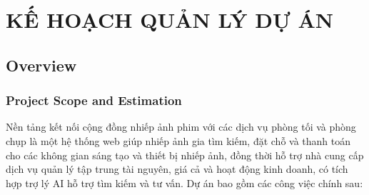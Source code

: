 \chapter{KẾ HOẠCH QUẢN LÝ DỰ ÁN}

\section{Overview}

\subsection{Project Scope and Estimation}

Nền tảng kết nối cộng đồng nhiếp ảnh phim với các dịch vụ phòng tối và phòng chụp là một hệ thống web giúp nhiếp ảnh gia tìm kiếm, đặt chỗ và thanh toán cho các không gian sáng tạo và thiết bị nhiếp ảnh, đồng thời hỗ trợ nhà cung cấp dịch vụ quản lý tập trung tài nguyên, giá cả và hoạt động kinh doanh, có tích hợp trợ lý AI hỗ trợ tìm kiếm và tư vấn. Dự án bao gồm các công việc chính sau:

